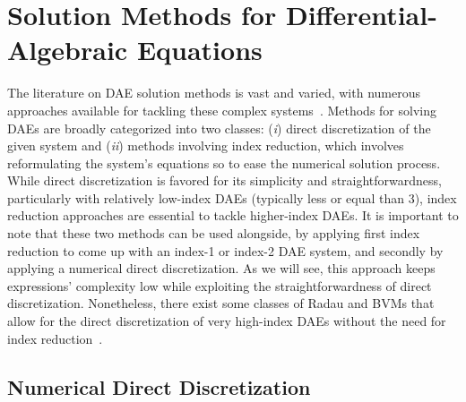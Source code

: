 
\section{Solution Methods for Differential-Algebraic Equations}

The literature on \ac{DAE} solution methods is vast and varied, with numerous approaches available for tackling these complex systems~\cite{brenan1995numerical, griepentrog1986differential, hairer1993solving, hairer1996solving}. Methods for solving \acp{DAE} are broadly categorized into two classes: (\emph{i}) direct discretization of the given system and (\emph{ii}) methods involving index reduction, which involves reformulating the system's equations so to ease the numerical solution process. While direct discretization is favored for its simplicity and straightforwardness, particularly with relatively low-index \acp{DAE} (typically less or equal than 3), index reduction approaches are essential to tackle higher-index \acp{DAE}. It is important to note that these two methods can be used alongside, by applying first index reduction to come up with an index-1 or index-2 \ac{DAE} system, and secondly by applying a numerical direct discretization. As we will see, this approach keeps expressions' complexity low while exploiting the straightforwardness of direct discretization. Nonetheless, there exist some classes of Radau and \acp{BVM} that allow for the direct discretization of very high-index \acp{DAE} without the need for index reduction~\cite{martinvaquero2010radau, amodio1993boundary, amodio1997parallel, amodio1998algorithm}.

\subsection{Numerical Direct Discretization}

